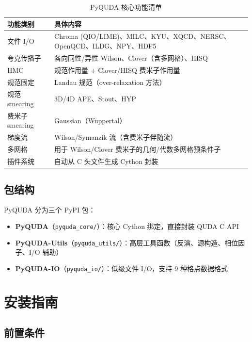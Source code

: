 \documentclass[12pt,a4paper]{ctexart}
\begin{document}
\begin{table}[h]
\centering
\begin{tabular}{@{}ll@{}}
\toprule
\textbf{功能类别} & \textbf{具体内容} \\
\midrule
文件 I/O  & Chroma (QIO/LIME)、MILC、KYU、XQCD、NERSC、OpenQCD、ILDG、NPY、HDF5 \\
夸克传播子 & 各向同性/异性 Wilson、Clover（含多网格）、HISQ \\
HMC       & 规范作用量 + Clover/HISQ 费米子作用量 \\
规范固定  & Landau 规范（over-relaxation 方法）\\
规范 smearing & 3D/4D APE、Stout、HYP \\
费米子 smearing & Gaussian（Wuppertal）\\
梯度流    & Wilson/Symanzik 流（含费米子伴随流）\\
多网格    & 用于 Wilson/Clover 费米子的几何/代数多网格预条件子 \\
插件系统  & 自动从 C 头文件生成 Cython 封装 \\
\bottomrule
\end{tabular}
\caption{PyQUDA 核心功能清单}
\end{table}

\subsection{包结构}

PyQUDA 分为三个 PyPI 包：
\begin{itemize}[itemsep=2pt]
    \item \textbf{PyQUDA}（\texttt{pyquda\_core/}）：核心 Cython 绑定，直接封装 QUDA C API
    \item \textbf{PyQUDA-Utils}（\texttt{pyquda\_utils/}）：高层工具函数（反演、源构造、相位因子、I/O 辅助）
    \item \textbf{PyQUDA-IO}（\texttt{pyquda\_io/}）：低级文件 I/O，支持 9 种格点数据格式
\end{itemize}

\section{安装指南}

\subsection{前置条件}
\end{document}

